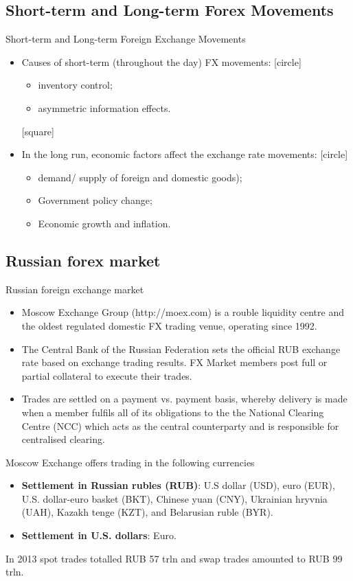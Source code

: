 \documentclass[international_finance_p1.tex]{subfiles}
\begin{document}
\subsection{Short-term  and Long-term Forex Movements}
\begin{frame}{Short-term  and Long-term Foreign Exchange Movements}
\begin{itemize}
\item
Causes of short-term (throughout the day) FX movements:
	[circle]
	\begin{itemize}
		\item
		inventory control;
		\item
		asymmetric information effects.
	\end{itemize}
[square]
\item
In the long run, economic factors affect the exchange rate movements:
	[circle]
	\begin{itemize}
	\item
	demand/ supply of foreign and domestic goods);
	\item
	Government policy change;
	\item
	Economic growth and inflation.
	\end{itemize}
\end{itemize}

\end{frame}
\subsection{Russian forex market}
\begin{frame}{Russian foreign exchange market}
\begin{itemize}[<+->]
\item
Moscow Exchange Group (http://moex.com) is a rouble liquidity centre and the oldest regulated domestic FX trading venue, operating since 1992.
\item
The Central Bank of the Russian Federation sets the official RUB exchange rate based on exchange trading results.
FX Market members post full or partial collateral to execute their trades. 
\item
Trades are settled on a payment vs. payment basis, whereby delivery is made when a member fulfils all of its obligations to the the National Clearing Centre (NCC) which acts as the central counterparty and is responsible for centralised clearing.
\end{itemize}
\end{frame}
\begin{frame}{Moscow Exchange offers trading in the following currencies}
\begin{itemize}[<+->]
\item
\textbf{Settlement in Russian rubles (RUB)}: U.S dollar (USD), euro (EUR), U.S. dollar-euro basket (BKT), Chinese yuan (CNY), Ukrainian hryvnia (UAH), Kazakh tenge (KZT), and Belarusian ruble (BYR).
\item
\textbf{Settlement in U.S. dollars}: Euro.
\end{itemize}
In 2013 spot trades totalled RUB 57 trln and swap trades amounted to RUB 99 trln.
\end{frame}
\end{document}
